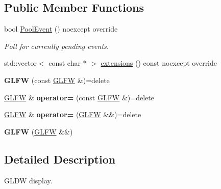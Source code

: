 \subsection*{Public Member Functions}
\begin{DoxyCompactItemize}
\item 
\hypertarget{classae_1_1_g_l_f_w_a3df047bd36e3e64d79e99038762b5ce2}{}\label{classae_1_1_g_l_f_w_a3df047bd36e3e64d79e99038762b5ce2} 
bool \hyperlink{classae_1_1_g_l_f_w_a3df047bd36e3e64d79e99038762b5ce2}{Pool\+Event} () noexcept override
\begin{DoxyCompactList}\small\item\em Poll for currently pending events. \end{DoxyCompactList}\item 
std\+::vector$<$ const char $\ast$ $>$ \hyperlink{classae_1_1_g_l_f_w_a5ec4f5b56e7f9a2011aaa4716503c563}{extensions} () const noexcept override
\end{DoxyCompactItemize}
{\bf }\par
\begin{DoxyCompactItemize}
\item 
\hypertarget{classae_1_1_g_l_f_w_a3f91f115acec8b4abc62d5f3f51c8674}{}\label{classae_1_1_g_l_f_w_a3f91f115acec8b4abc62d5f3f51c8674} 
{\bfseries G\+L\+FW} (const \hyperlink{classae_1_1_g_l_f_w}{G\+L\+FW} \&)=delete
\item 
\hypertarget{classae_1_1_g_l_f_w_afaa7b320295e3437529407c51d279e31}{}\label{classae_1_1_g_l_f_w_afaa7b320295e3437529407c51d279e31} 
\hyperlink{classae_1_1_g_l_f_w}{G\+L\+FW} \& {\bfseries operator=} (const \hyperlink{classae_1_1_g_l_f_w}{G\+L\+FW} \&)=delete
\item 
\hypertarget{classae_1_1_g_l_f_w_a8861b3f032ffac11487bee363e91b400}{}\label{classae_1_1_g_l_f_w_a8861b3f032ffac11487bee363e91b400} 
\hyperlink{classae_1_1_g_l_f_w}{G\+L\+FW} \& {\bfseries operator=} (\hyperlink{classae_1_1_g_l_f_w}{G\+L\+FW} \&\&)=delete
\item 
\hypertarget{classae_1_1_g_l_f_w_a968689c66e954617a81704025c73f016}{}\label{classae_1_1_g_l_f_w_a968689c66e954617a81704025c73f016} 
{\bfseries G\+L\+FW} (\hyperlink{classae_1_1_g_l_f_w}{G\+L\+FW} \&\&)
\end{DoxyCompactItemize}



\subsection{Detailed Description}
G\+L\+DW display. 

